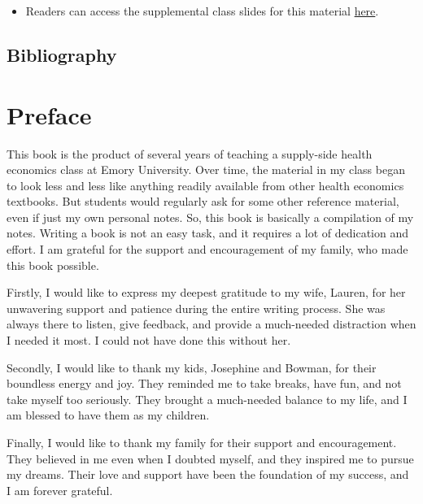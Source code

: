 \documentclass[
  letterpaper,
  DIV=11,
  numbers=noendperiod]{scrreport}
\providecommand{\tightlist}{%
  \setlength{\itemsep}{0pt}\setlength{\parskip}{0pt}}\usepackage{longtable,booktabs,array}
\theoremstyle{definition}
\theoremstyle{remark}
\begin{document}

\begin{itemize}
\tightlist
\item
  Readers can access the supplemental class slides for this material
  \href{supp/index-slides.html}{here}.
\end{itemize}

\hypertarget{bibliography}{%
\section*{Bibliography}\label{bibliography}}



\hypertarget{preface}{%
\chapter*{Preface}\label{preface}}


This book is the product of several years of teaching a supply-side
health economics class at Emory University. Over time, the material in
my class began to look less and less like anything readily available
from other health economics textbooks. But students would regularly ask
for some other reference material, even if just my own personal notes.
So, this book is basically a compilation of my notes. Writing a book is
not an easy task, and it requires a lot of dedication and effort. I am
grateful for the support and encouragement of my family, who made this
book possible.

Firstly, I would like to express my deepest gratitude to my wife,
Lauren, for her unwavering support and patience during the entire
writing process. She was always there to listen, give feedback, and
provide a much-needed distraction when I needed it most. I could not
have done this without her.

Secondly, I would like to thank my kids, Josephine and Bowman, for their
boundless energy and joy. They reminded me to take breaks, have fun, and
not take myself too seriously. They brought a much-needed balance to my
life, and I am blessed to have them as my children.

Finally, I would like to thank my family for their support and
encouragement. They believed in me even when I doubted myself, and they
inspired me to pursue my dreams. Their love and support have been the
foundation of my success, and I am forever grateful.
\end{document}
